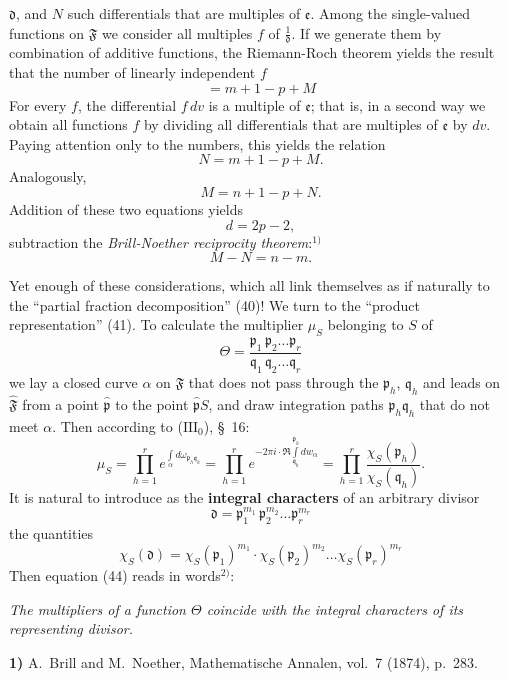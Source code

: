 \documentclass{article}
\begin{document}
$\mathfrak{d}$, and $N$ such differentials that are multiples of $\mathfrak{e}$. Among the single-valued functions on $\mathfrak{F}$ we consider all multiples $f$ of $\frac{1}{\mathfrak{d}}$. If we generate them by combination of additive functions, the Riemann-Roch theorem yields the result that the number of linearly independent $f$
\[ = m + 1 - p + M \]
For every $f$, the differential $f\,dv$ is a multiple of $\mathfrak{e}$; that is, in a second way we obtain all functions $f$ by dividing all differentials that are multiples of $\mathfrak{e}$ by $dv$. Paying attention only to the numbers, this yields the relation
\[ N = m + 1 - p + M. \]
Analogously,
\[ M = n + 1 - p + N. \]
Addition of these two equations yields
\[ d = 2p - 2, \]
subtraction the \emph{Brill-Noether reciprocity theorem}:${}^{1)}$
\[ M - N = n - m. \]

Yet enough of these considerations, which all link themselves as if naturally to the ``partial fraction decomposition'' (40)! We turn to the ``product representation'' (41). To calculate the multiplier $\mu_S$ belonging to $S$ of
\[ \Theta = \frac{\mathfrak{p}_1 \, \mathfrak{p}_2 \dots \mathfrak{p}_r}{\mathfrak{q}_1 \, \mathfrak{q}_2 \dots \mathfrak{q}_r} \]
we lay a closed curve $\alpha$ on $\mathfrak{F}$ that does not pass through the $\mathfrak{p}_h$, $\mathfrak{q}_h$ and leads on $\hat{\mathfrak{F}}$ from a point $\hat{\mathfrak{p}}$ to the point $\hat{\mathfrak{p}}S$, and draw integration paths $\mathfrak{p}_h\mathfrak{q}_h$ that do not meet $\alpha$. Then according to ($\mathrm{III}_0$), §~16:
\[ \mu_S = \prod_{h=1}^r e^{\int\limits_\alpha d\omega_{\mathfrak{p}_h \mathfrak{q}_h}} = \prod_{h=1}^r e^{-2\pi i \cdot \Re \int\limits_{\mathfrak{q}_h}^{\mathfrak{p}_h} dw_\alpha} = \prod_{h=1}^r \frac{\chi_S(\mathfrak{p}_h)}{\chi_S(\mathfrak{q}_h)}. \tag{44} \]
It is natural to introduce as the \textbf{integral characters} of an arbitrary divisor
\[ \mathfrak{d} = \mathfrak{p}_1^{m_1} \, \mathfrak{p}_2^{m_2} \dots \mathfrak{p}_r^{m_r} \]
the quantities
\[ \chi_S(\mathfrak{d}) = \chi_S(\mathfrak{p}_1)^{m_1} \cdot \chi_S(\mathfrak{p}_2)^{m_2} \dots \chi_S(\mathfrak{p}_r)^{m_r} \]
Then equation (44) reads in words${}^{2)}$:

\emph{The multipliers of a function $\Theta$ coincide with the integral characters of its representing divisor.}

\textbf{1)} A.~Brill and M.~Noether, Mathematische Annalen, vol.~7 (1874), p.~283.
\end{document}

